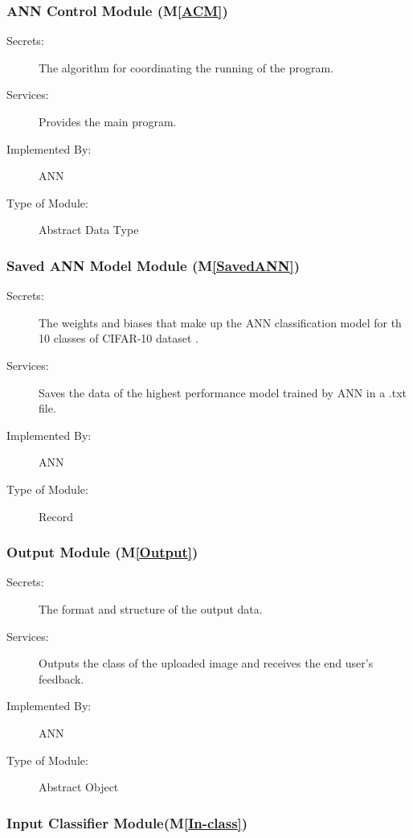 \documentclass[12pt, titlepage]{article}
\newcommand{\mref}[1]{M\ref{#1}}
\begin{document}
\subsubsection{ANN Control Module (\mref{ACM})}

\begin{description}
\item[Secrets:]The algorithm for coordinating the running of the program.
\item[Services:]Provides the main program.
\item[Implemented By:] ANN
\item[Type of Module:] Abstract Data Type
\end{description}

\subsubsection{Saved ANN Model Module (\mref{SavedANN})}

\begin{description}
  \item[Secrets:]The weights and biases that make up the ANN classification model for th 10
  classes of CIFAR-10 dataset \cite{CIFAR10}.
  \item[Services:]Saves the data of the highest performance model trained by ANN in 
  a .txt file.
  \item[Implemented By:] ANN
  \item[Type of Module:] Record
  \end{description}

\subsubsection{Output Module (\mref{Output})}

\begin{description}
\item[Secrets:]The format and structure of the output data.
\item[Services:]Outputs the class of the uploaded image and receives 
the end user's feedback.
\item[Implemented By:] ANN
\item[Type of Module:] Abstract Object
\end{description}

\subsubsection{Input Classifier Module(\mref{In-class})}
\end{document}
